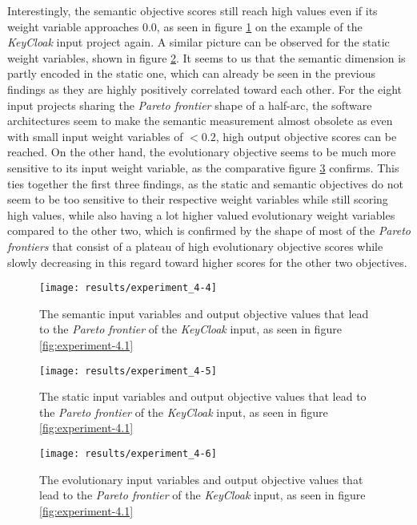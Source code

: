 \documentclass[12pt,a4paper]{report}
\begin{document}
Interestingly, the semantic objective scores still reach high values even if
its weight variable approaches $0.0$, as seen in figure \ref{fig:experiment-4.4}
on the example of the \textit{KeyCloak} input project again.
A similar picture can be observed for the static weight variables, shown in
figure \ref{fig:experiment-4.5}.
It seems to us that the semantic dimension is partly encoded in the static one,
which can already be seen in the previous findings as they are highly
positively correlated toward each other. For the eight input projects sharing
the \textit{Pareto frontier} shape of a half\hyp arc, the software architectures
seem to make the semantic measurement almost obsolete as even with small input
weight variables of $<0.2$, high output objective scores can be reached.
On the other hand, the evolutionary objective seems to be much more sensitive
to its input weight variable, as the comparative figure \ref{fig:experiment-4.6}
confirms. This ties together the first three findings, as the static and
semantic objectives do not seem to be too sensitive to their respective weight
variables while still scoring high values, while also having a lot higher valued
evolutionary weight variables compared to the other two, which is confirmed by
the shape of most of the \textit{Pareto frontiers} that consist of a plateau
of high evolutionary objective scores while slowly decreasing in this regard
toward higher scores for the other two objectives.

\begin{figure}[htbp]
\centering
\texttt{[image: results/experiment\_4-4]}
\caption{The semantic input variables and output objective values that lead to the \textit{Pareto frontier} of the \textit{KeyCloak} input, as seen in figure \ref{fig:experiment-4.1}}
\label{fig:experiment-4.4}
\end{figure}

\begin{figure}[htbp]
\centering
\texttt{[image: results/experiment\_4-5]}
\caption{The static input variables and output objective values that lead to the \textit{Pareto frontier} of the \textit{KeyCloak} input, as seen in figure \ref{fig:experiment-4.1}}
\label{fig:experiment-4.5}
\end{figure}

\begin{figure}[htbp]
\centering
\texttt{[image: results/experiment\_4-6]}
\caption{The evolutionary input variables and output objective values that lead to the \textit{Pareto frontier} of the \textit{KeyCloak} input, as seen in figure \ref{fig:experiment-4.1}}
\label{fig:experiment-4.6}
\end{figure}
\end{document}

